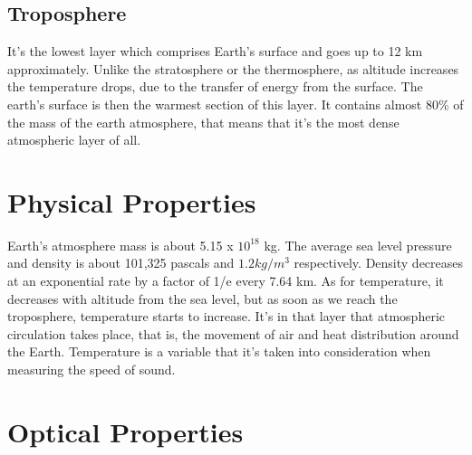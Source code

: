 \documentclass[a4paper]{article}
\begin{document}
\subsection{Troposphere}
It's the lowest layer which comprises Earth's surface and goes up to 12 km approximately. Unlike the stratosphere or the thermosphere, as altitude increases the temperature drops, due to the transfer of energy from the surface. The earth's surface is then the warmest section of this layer. It contains almost 80\% of the mass of the earth atmosphere, that means that it's the most dense atmospheric layer of all. 

\section{Physical Properties}
Earth's atmosphere mass is about 5.15 x $10^{18}$ kg. The average sea level pressure and density is about 101,325 pascals and $1.2 kg/m^3$ respectively. Density decreases at an exponential rate by a factor of 1/e every 7.64 km. As for temperature, it decreases with altitude from the sea level, but as soon as we reach the troposphere, temperature starts to increase. It's in that layer that atmospheric circulation takes place, that is, the movement of air and heat distribution around the Earth. Temperature is a variable that it's taken into consideration when measuring the speed of sound. 

\section{Optical Properties}
\end{document}
